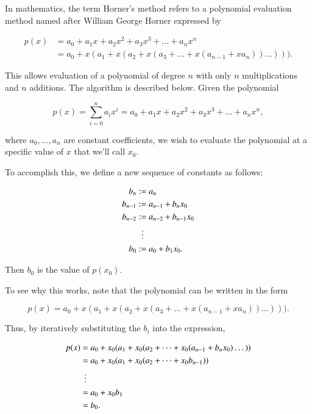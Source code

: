 \documentclass[preprint,12pt]{elsarticle}
\begin{document}
In mathematics, the term Horner's method refers to a polynomial evaluation method named after William George Horner expressed by

\begin{equation}
    \begin{split}
        p(x) &= a_0+a_1 x+a_2x^2+ a_3x^3+\dots+a_{n}x^n\\
        &= a_0+x(a_1+x(a_2+x(a_3+\dots+x(a_{n-1}+{x}a_n))\dots))).
    \end{split}
\end{equation}

This allows evaluation of a polynomial of degree $n$ with only $n$ multiplications and $n$ additions. The algorithm is described below. Given the polynomial

\begin{equation}
    p(x)=\sum_{i=0}^n{a_i x^i}=a_0+a_1 x+a_2x^2+ a_3x^3+\dots+a_{n}x^n,
\end{equation}

where $a_0,\dots,a_n$ are constant coefficients, we wish to evaluate the polynomial at a specific value of $x$ that we'll call $x_0$.

To accomplish this, we define a new sequence of constants as follows:

\begin{equation}
    \begin{split}
        b_n &:= a_n\\
        b_{n-1} &:= a_{n-1}+b_{n}x_0\\
        b_{n-2} &:= a_{n-2}+b_{n-1}x_0\\
        & \vdotswithin{:=} \\
        b_0 &:= a_0+b_1 x_0.
    \end{split}
\end{equation}

Then $b_0$ is the value of $p(x_0)$.

To see why this works, note that the polynomial can be written in the form

\begin{equation}
    p(x)=a_0+x(a_1+x(a_2+x(a_3+\dots+x(a_{n-1}+{x}a_n))\dots))).
\end{equation}

Thus, by iteratively substituting the $b_i$ into the expression, 
 
\begin{equation}
    \begin{split}
        p(x)&=a_0+x_0(a_1+x_0(a_2+\dots+x_0(a_{n-1}+b_n{x_0})\dots))\\
        &=a_0+x_0(a_1+x_0(a_2+\dots+x_0{b_{n-1}}))\\
        & \vdotswithin{=} \\
        &=a_0+x_0 b_1\\
        &=b_0.
    \end{split}
\end{equation}
\end{document}

